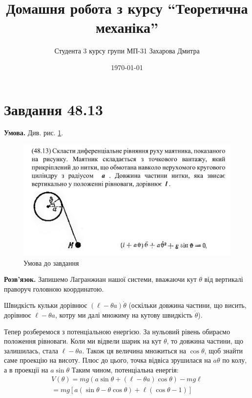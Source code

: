 \documentclass[14pt]{extarticle}
\title{Домашня робота з курсу ``Теоретична механіка''}
\author{Студента 3 курсу групи МП-31 Захарова Дмитра}
\date{\today}
\begin{document}
\maketitle

\section*{Завдання 48.13}

\textbf{Умова.} Див. рис. \ref{fig:1}.
\begin{figure}[H]
    \centering
    \includegraphics[width=\textwidth]{images/hw_14/fig_1.png}
    \caption{Умова до завдання}
    \label{fig:1}
\end{figure}

\textbf{Розв'язок.} Запишемо Лагранжиан нашої системи, вважаючи кут $\theta$ від вертикалі праворуч головною координатою. 

Швидкість кульки дорівнює $(\ell-\theta a)\dot{\theta}$ (оскільки довжина частини, що висить, дорівнює $\ell-\theta a$, котру ми далі множиму на кутову швидкість $\dot{\theta}$). 

Тепер розберемося з потенціальною енергією. За нульовий рівень обираємо положення рівноваги. Коли ми відвели шарик на кут $\theta$, то довжина частини, що залишилась, стала $\ell - \theta a$. Також ця величина множиться на $\cos\theta$, щоб знайти саме проекцію на висоту. Плюс до цього, точка відвіса зрушилася на $a\theta$ по колу, а в проекції на $a\sin\theta$ Таким чином, потенціальна енергія:
\begin{gather*}
V(\theta) = mg(a\sin\theta+(\ell-\theta a)\cos\theta) - mg\ell  \\
= mg\left[a(\sin\theta - \theta \cos\theta) + \ell(\cos\theta-1)\right]
\end{gather*}
\end{document}
